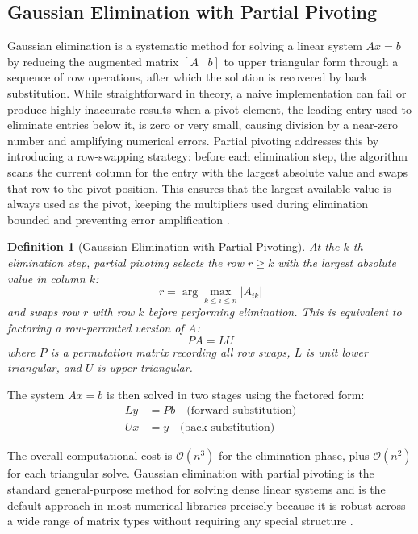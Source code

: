 \documentclass[12pt,a4paper]{report}
\newtheorem{definition}{Definition}[chapter]
\begin{document}
\subsection{Gaussian Elimination with Partial Pivoting}

Gaussian elimination is a systematic method for solving a linear system \( Ax = b \) by reducing the augmented matrix \( [A \mid b] \) to upper triangular form through a sequence of row operations, after which the solution is recovered by back substitution. While straightforward in theory, a naive implementation can fail or produce highly inaccurate results when a pivot element, the leading entry used to eliminate entries below it, is zero or very small, causing division by a near-zero number and amplifying numerical errors. Partial pivoting addresses this by introducing a row-swapping strategy: before each elimination step, the algorithm scans the current column for the entry with the largest absolute value and swaps that row to the pivot position. This ensures that the largest available value is always used as the pivot, keeping the multipliers used during elimination bounded and preventing error amplification \parencite{anton2014elementary}.

\begin{definition}[Gaussian Elimination with Partial Pivoting]
    At the \( k \)-th elimination step, partial pivoting selects the row 
    \( r \geq k \) with the largest absolute value in column \( k \):
    \[
        r = \arg\max_{k \leq i \leq n} |A_{ik}|
    \]
    and swaps row \( r \) with row \( k \) before performing elimination. This 
    is equivalent to factoring a row-permuted version of \( A \):
    \[
        PA = LU
    \]
    where \( P \) is a permutation matrix recording all row swaps, \( L \) is unit lower triangular, and \( U \) is upper triangular.
\end{definition}

The system \( Ax = b \) is then solved in two stages using the factored form:
\begin{align*}
    Ly &= Pb \quad \text{(forward substitution)} \\
    Ux &= y  \quad \text{(back substitution)}
\end{align*}

The overall computational cost is \( \mathcal{O}(n^3) \) for the elimination phase, plus \( \mathcal{O}(n^2) \) for each triangular solve. Gaussian elimination with partial pivoting is the standard general-purpose method for solving dense linear systems and is the default approach in most numerical libraries precisely because it is robust across a wide range of matrix types without requiring any special structure \parencite{anton2014elementary}.
\end{document}
